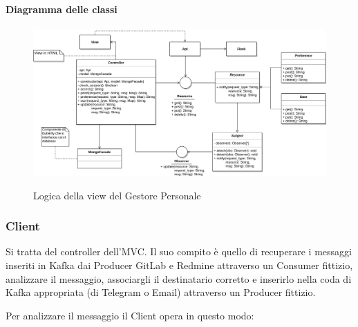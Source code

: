     \paragraph{Diagramma delle classi}

    \begin{figure}[H]
        \centering
        \includegraphics[width=\textwidth]{img/GP-View.png}\\
        \caption{Logica della view del Gestore Personale}
        \label{fig:GP-View}
    \end{figure}



\subsubsection{Client}
Si tratta del controller dell'MVC. Il suo compito è quello di recuperare i messaggi inseriti in Kafka dai Producer GitLab e Redmine attraverso un Consumer fittizio, analizzare il messaggio, associargli il destinatario corretto e inserirlo nella coda di Kafka appropriata (di Telegram o Email) attraverso un Producer fittizio.

Per analizzare il messaggio il Client opera in questo modo:

